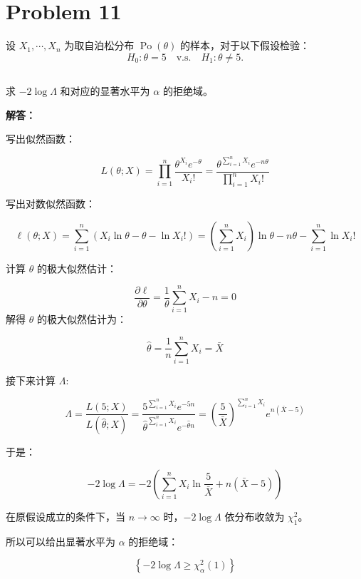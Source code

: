 \documentclass[12pt,a4paper]{article}
\begin{document}
\section{Problem 11}


设 $X_1,\cdots,X_n$ 为取自泊松分布 $\operatorname{Po}(\theta)$ 的样本，对于以下假设检验：
\[
  H_0:\theta=5\quad \text{v.s.}\quad H_1:\theta\ne 5.
\]

\subsection{}

求 $-2\log\Lambda$ 和对应的显著水平为 $\alpha$ 的拒绝域。

\begin{answerbox}
\textbf{解答：}

写出似然函数：

$$
L(\theta; X) = \prod_{i=1}^n \frac{\theta^{X_i} e^{-\theta}}{X_i!} = \frac{\theta^{\sum_{i=1}^n X_i} e^{-n\theta}}{\prod_{i=1}^n X_i!}
$$


写出对数似然函数：

$$
\ell(\theta; X) = \sum_{i=1}^n \left( X_i \ln \theta - \theta - \ln X_i! \right) = \left( \sum_{i=1}^n X_i \right) \ln \theta - n\theta - \sum_{i=1}^n \ln X_i!
$$


计算 $\theta$ 的极大似然估计：

$$
\frac{\partial \ell}{\partial \theta} = \frac{1}{\theta} \sum_{i=1}^n X_i - n = 0
$$
解得 $\theta$ 的极大似然估计为：

$$
\hat{\theta} = \frac{1}{n} \sum_{i=1}^n X_i = \bar{X}
$$

接下来计算 $\Lambda$:

$$
\Lambda = \frac{L(5; X)}{L(\hat{\theta}; X)} = \frac{5^{\sum_{i=1}^n X_i} e^{-5n}}{\hat{\theta}^{\sum_{i=1}^n X_i} e^{-\hat{\theta} n}} = \left(\frac{5}{\bar{X}}\right)^{\sum_{i=1}^n X_i} e^{n(\bar{X}-5)}
$$

于是：

$$
-2\log \Lambda = -2 \left( \sum_{i=1}^n X_i \ln \frac{5}{\bar{X}} + n(\bar{X}-5) \right)
$$

在原假设成立的条件下，当 $n \to \infty$ 时，$-2\log \Lambda$ 依分布收敛为 $\chi^2_1$。

所以可以给出显著水平为 $\alpha$ 的拒绝域：

$$
\left\{-2\log \Lambda \geq \chi^2_{\alpha}(1)\right\}
$$
\end{answerbox}

\subsection{}
\end{document}
